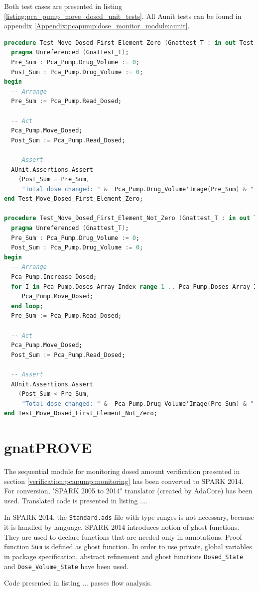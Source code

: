 Both test cases are presented in listing \ref{listing:pca_pump_move_dosed_unit_tests}. All Aunit tests can be found in appendix \ref{Appendix:pcapump:dose_monitor_module:aunit}.

\begin{lstlisting}[language=ada, frame=single, gobble=0, caption={AUnit tests for Move\_Dosed procedure}, label={listing:pca_pump_move_dosed_unit_tests}]
procedure Test_Move_Dosed_First_Element_Zero (Gnattest_T : in out Test) is
  pragma Unreferenced (Gnattest_T);
  Pre_Sum : Pca_Pump.Drug_Volume := 0;
  Post_Sum : Pca_Pump.Drug_Volume := 0;
begin
  -- Arrange
  Pre_Sum := Pca_Pump.Read_Dosed;

  -- Act
  Pca_Pump.Move_Dosed;
  Post_Sum := Pca_Pump.Read_Dosed;

  -- Assert
  AUnit.Assertions.Assert
    (Post_Sum = Pre_Sum,
     "Total dose changed: " &  Pca_Pump.Drug_Volume'Image(Pre_Sum) & " /= " &  Pca_Pump.Drug_Volume'Image(Post_Sum));
end Test_Move_Dosed_First_Element_Zero;

procedure Test_Move_Dosed_First_Element_Not_Zero (Gnattest_T : in out Test) is
  pragma Unreferenced (Gnattest_T);
  Pre_Sum : Pca_Pump.Drug_Volume := 0;
  Post_Sum : Pca_Pump.Drug_Volume := 0;
begin
  -- Arrange
  Pca_Pump.Increase_Dosed;
  for I in Pca_Pump.Doses_Array_Index range 1 .. Pca_Pump.Doses_Array_Index'Last-1 loop
     Pca_Pump.Move_Dosed;
  end loop;
  Pre_Sum := Pca_Pump.Read_Dosed;

  -- Act
  Pca_Pump.Move_Dosed;
  Post_Sum := Pca_Pump.Read_Dosed;

  -- Assert
  AUnit.Assertions.Assert
    (Post_Sum < Pre_Sum,
     "Total dose changed: " &  Pca_Pump.Drug_Volume'Image(Pre_Sum) & " should be greater than " &  Pca_Pump.Drug_Volume'Image(Post_Sum));
end Test_Move_Dosed_First_Element_Not_Zero;
\end{lstlisting}


\section{gnatPROVE}
\label{verification:gnatprove}

The sequential module for monitoring dosed amount verification presented in section \ref{verification:pcapump:monitoring} has been converted to SPARK 2014. For conversion, "SPARK 2005 to 2014" translator (created by AdaCore) has been used. Translated code is presented in listing .... 

In SPARK 2014, the \lstinline{Standard.ads} file with type ranges is not necessary, because it is handled by language. SPARK 2014 introduces notion of ghost functions. They are used to declare functions that are needed only in annotations. Proof function \lstinline{Sum} is defined as ghost function. In order to use private, global variables in package specification, abstract refinement and ghost functions \lstinline{Dosed_State} and \lstinline{Dose_Volume_State} have been used. 


Code presented in listing ... passes flow analysis. 



